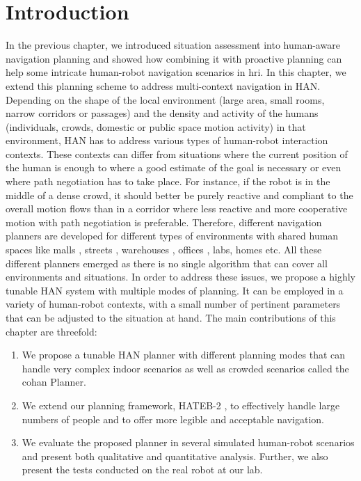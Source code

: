 \section{Introduction}
In the previous chapter, we introduced situation assessment into human-aware navigation planning and showed how combining it with proactive planning can help some intricate human-robot navigation scenarios in \acrshort{hri}. In this chapter, we extend this planning scheme to address multi-context navigation in HAN. Depending on the shape of the local environment (large area, small rooms, narrow corridors or passages) and the density and activity of the humans (individuals, crowds, domestic or public space motion activity) in that environment, HAN has to address various types of human-robot interaction contexts. These contexts can differ from situations where the current position of the human is enough to where a good estimate of the goal is necessary or even where path negotiation has to take place. For instance, if the robot is in the middle of a dense crowd, it should better be purely reactive and compliant to the overall motion flows than in a corridor where less reactive and more cooperative motion with path negotiation is preferable. Therefore, different navigation planners are developed for different types of environments with shared human spaces like malls \cite{foster2019mummer}, streets \cite{ferrer2013social}, warehouses  \cite{carmona2019making}, offices \cite{truong2014dynamic}, labs, homes \cite{kollmitz2015time} etc. All these different planners emerged as there is no single algorithm that can cover all environments and situations. In order to address these issues, we propose a highly tunable HAN system with multiple modes of planning. It can be employed in a variety of human-robot contexts, with a small number of pertinent parameters that can be adjusted to the situation at hand. The main contributions of this chapter are threefold:
\begin{enumerate}
    \item We propose a tunable HAN planner with different planning modes that can handle very complex indoor scenarios as well as crowded scenarios called the \acrfull{cohan} Planner.
    \item We extend our planning framework, HATEB-2 \cite{singamaneni2020hateb}, to effectively handle large numbers of people and to offer more legible and acceptable navigation.
    \item We evaluate the proposed planner in several simulated human-robot scenarios and present both qualitative and quantitative analysis. Further, we also present the tests conducted on the real robot at our lab.
\end{enumerate}

